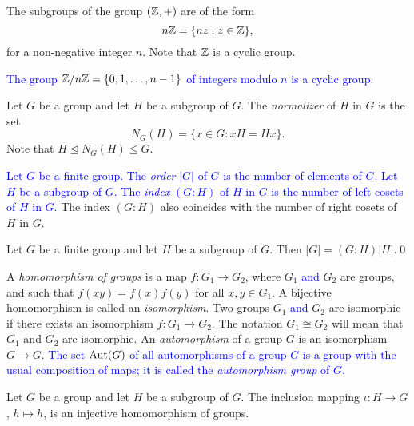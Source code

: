 \begin{example}
	The subgroups of the group $(\mathbb{Z},+)$ are of the form
	\[
	n\mathbb{Z}=\{ nz: z\in\mathbb{Z}\},
	\]
	for a non-negative integer $n$. Note that $\mathbb{Z}$ is a cyclic group.  
\end{example} 

\begin{example}
\textcolor{blue}{The group $\mathbb{Z}/n\mathbb{Z}=\{0,1,\dots,n-1\}$ of integers modulo $n$ is a cyclic group.}
\end{example}

\begin{example} 
Let $G$ be a group and let $H$ be a subgroup of $G$. 
The \emph{normalizer} of $H$ in $G$ is the set
	\[
	N_G(H)=\{ x\in G: xH=Hx\}.
	\]
	Note that $H\unlhd N_G(H)\leq G$.
\end{example}

\textcolor{blue}{Let $G$ be a finite group. The {\em order} $|G|$ of $G$ is the number of elements of $G$. Let $H$ be a subgroup of $G$. The {\em index} 
$(G:H)$ of $H$ in $G$ is the number of left cosets of $H$ in $G$.}
The index $(G:H)$ also coincides with the number of right cosets of $H$ in $G$.

\begin{theorem}
Let $G$ be a finite group and let $H$ be a subgroup of $G$. 
Then $|G|=(G:H)|H|$.\qed
\end{theorem}

A {\em homomorphism of groups} is a map $f\colon G_1\rightarrow G_2$, where $G_1$ \textcolor{blue}{and} $G_2$ 
are groups, and such that $f(xy)=f(x)f(y)$ for all $x,y\in G_1$. A bijective homomorphism is called an {\em isomorphism}. Two groups $G_1$ \textcolor{blue}{and} $G_2$ are isomorphic if there exists an isomorphism $f\colon G_1\rightarrow G_2$. The notation $G_1\cong G_2$ will mean that $G_1$ and $G_2$ are isomorphic. 
An {\em automorphism} of a group $G$ is an isomorphism $G\to G$. \textcolor{blue}{The set $\operatorname{Aut}(G)$ of all automorphisms of a group $G$ is a group with the usual 
composition of maps; it is called the {\em automorphism group} of $G$.}

\begin{example} 
    Let $G$ be a group and let $H$ be a subgroup of $G$. 
    The inclusion mapping $\iota\colon H\rightarrow G$, $h\mapsto h$, is an injective homomorphism of groups. 
\end{example}

